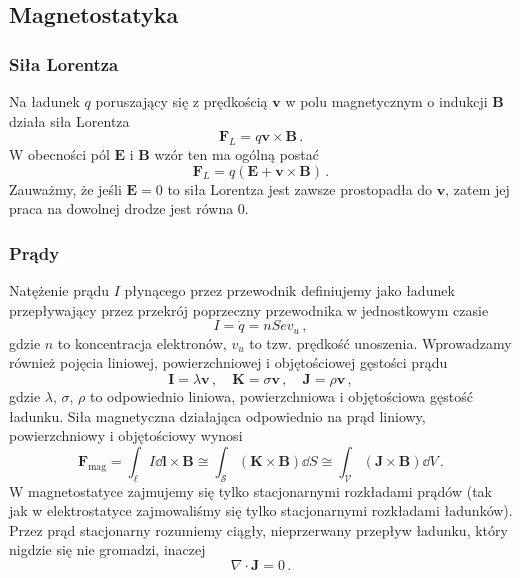 \documentclass[../main.tex]{subfiles}
\begin{document}
\subsection{Magnetostatyka}
\subsubsection{Siła Lorentza}
Na ładunek \(q\) poruszający się z prędkością \(\mathbf{v}\) w polu magnetycznym o indukcji
\(\mathbf{B}\) działa siła Lorentza
\begin{equation*}
    \mathbf{F}_L=q\mathbf{v}\times\mathbf{B}\,.
\end{equation*}
W obecności pól \(\mathbf{E}\) i \(\mathbf{B}\) wzór ten ma ogólną postać
\begin{equation*}
    \mathbf{F}_L=q(\mathbf{E}+\mathbf{v}\times\mathbf{B})\,.
\end{equation*}
Zauważmy, że jeśli \(\mathbf{E}=0\) to siła Lorentza jest zawsze prostopadła do \(\mathbf{v}\),
zatem jej praca na dowolnej drodze jest równa 0.
\subsubsection{Prądy}
Natężenie prądu \(I\) płynącego przez przewodnik definiujemy jako ładunek przepływający przez
przekrój poprzeczny przewodnika w jednostkowym czasie
\begin{equation*}
    I=\dot q=nSev_u\,,
\end{equation*}
gdzie \(n\) to koncentracja elektronów, \(v_u\) to tzw. prędkość unoszenia. Wprowadzamy również
pojęcia liniowej, powierzchniowej i objętościowej gęstości prądu
\begin{equation*}
    \mathbf{I}=\lambda\mathbf{v}\,,\quad\mathbf{K}=\sigma\mathbf{v}\,,\quad\mathbf{J}=\rho\mathbf{v}\,,
\end{equation*}
gdzie \(\lambda\), \(\sigma\), \(\rho\) to odpowiednio liniowa, powierzchniowa i objętościowa
gęstość ładunku. Siła magnetyczna działająca odpowiednio na prąd liniowy, powierzchniowy i
objętościowy wynosi
\begin{equation*}
    \mathbf{F}_\text{mag}=\int_\ell I\dd{\mathbf{l}}\times\mathbf{B}\cong\int_\mathcal{S}(\mathbf{K}\times\mathbf{B})\dd{S}\cong\int_\mathcal{V}(\mathbf{J}\times\mathbf{B})\dd{V}\,.
\end{equation*}
W magnetostatyce zajmujemy się tylko stacjonarnymi rozkładami prądów (tak jak w elektrostatyce
zajmowaliśmy się tylko stacjonarnymi rozkładami ładunków). Przez prąd stacjonarny rozumiemy ciągły,
nieprzerwany przepływ ładunku, który nigdzie się nie gromadzi, inaczej
\begin{equation*}
    \nabla\cdot\mathbf{J}=0\,.
\end{equation*}
\end{document}
